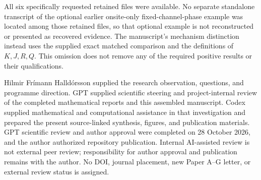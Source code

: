 \documentclass[11pt,a4paper]{article}
\numberwithin{equation}{section}
\theoremstyle{remark}\newtheorem{remark}[theorem]{Remark}
\begin{document}
All six specifically requested retained files were available. No separate standalone transcript of the optional earlier onsite-only fixed-channel-phase example was located among those retained files, so that optional example is not reconstructed or presented as recovered evidence. The manuscript's mechanism distinction instead uses the supplied exact matched comparison and the definitions of $K,J,R,Q$. This omission does not remove any of the required positive results or their qualifications.

Hilmir Fr\'imann Halld\'orsson supplied the research observation, questions, and programme direction. GPT supplied scientific steering and project-internal review of the completed mathematical reports and this assembled manuscript. Codex supplied mathematical and computational assistance in that investigation and prepared the present source-linked synthesis, figures, and publication materials. GPT scientific review and author approval were completed on 28 October 2026, and the author authorized repository publication. Internal AI-assisted review is not external peer review; responsibility for author approval and publication remains with the author. No DOI, journal placement, new Paper A--G letter, or external review status is assigned.


\end{document}
